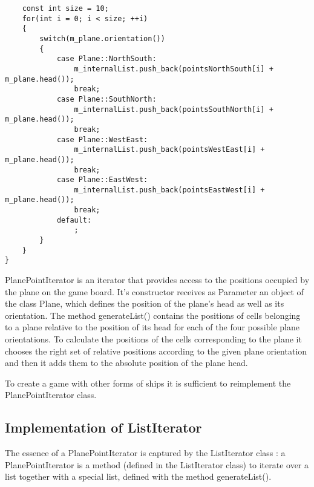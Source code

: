 \begin{lstlisting}
    const int size = 10;
    for(int i = 0; i < size; ++i)
    {
        switch(m_plane.orientation())
        {
            case Plane::NorthSouth:
                m_internalList.push_back(pointsNorthSouth[i] + m_plane.head());
                break;
            case Plane::SouthNorth:
                m_internalList.push_back(pointsSouthNorth[i] + m_plane.head());
                break;
            case Plane::WestEast:
                m_internalList.push_back(pointsWestEast[i] + m_plane.head());
                break;
            case Plane::EastWest:
                m_internalList.push_back(pointsEastWest[i] + m_plane.head());
                break;
            default:
                ;
        }
    }
}
\end{lstlisting}

PlanePointIterator is an iterator that provides access to the positions occupied by the plane on the game board. It's constructor receives as Parameter an object of the class Plane, which defines the position of the plane's head as well as its orientation. The method generateList() contains the positions of cells belonging to a plane relative to the position of its head for each of the four possible plane orientations. To calculate the positions of the cells corresponding to the plane it chooses the right set of relative positions according to the given plane orientation and then it adds them to the absolute position of the plane head.

To create a game with other forms of ships it is sufficient to reimplement the PlanePointIterator class.

\subsection {Implementation of ListIterator}

The essence of a PlanePointIterator is captured by the ListIterator class : a PlanePointIterator is a method (defined in the ListIterator class) to iterate over a list together with a special list, defined with the method generateList().

